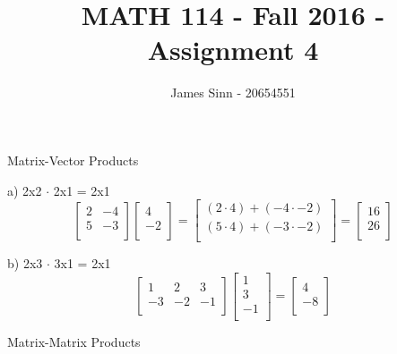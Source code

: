 \documentclass[12pt]{article}
\newcommand{\sqbrl}{\left[}
\newcommand{\sqbrr}{\right]}
\newenvironment{problem}[2][Problem]{\begin{trivlist}
\item[\hskip \labelsep {\bfseries #1}\hskip \labelsep {\bfseries #2.}]}{\end{trivlist}}
\begin{document}
 
 
\title{MATH 114 - Fall 2016 - Assignment 4}
\author{James Sinn - 20654551}
\maketitle
 
 \begin{problem}{1}
 	Matrix-Vector Products
 \end{problem}
 
a) 2x2 $\cdot$ 2x1 = 2x1\\ 
	 \[\sqbrl\begin{matrix}2 & -4\\5 & -3\\ \end{matrix}\sqbrr \sqbrl\begin{matrix}4\\-2\\\end{matrix}\sqbrr
	 = \sqbrl\begin{matrix}(2\cdot4) + (-4\cdot-2)\\(5\cdot4)+(-3\cdot-2)\\\end{matrix}\sqbrr 
	 = \sqbrl\begin{matrix}16\\26\\\end{matrix}\sqbrr\]
	  
b) 2x3 $\cdot$ 3x1 = 2x1\\
	\[\sqbrl\begin{matrix}1 & 2 & 3\\-3 &-2 & -1\\\end{matrix}\sqbrr\sqbrl\begin{matrix}1\\3\\-1\\\end{matrix}\sqbrr
	= \sqbrl\begin{matrix}4\\-8\\\end{matrix}\sqbrr\]

\begin{problem}{2}
	Matrix-Matrix Products
\end{problem}
\end{document}
